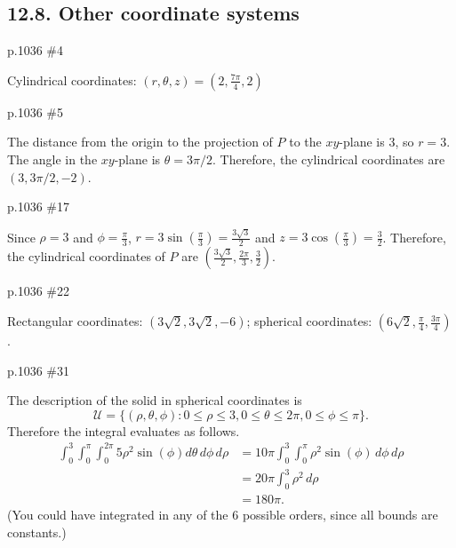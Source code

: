 \subsection{12.8. Other coordinate systems}
\begin{practice}p.1036 \#4\end{practice}
\begin{pracsol}
  Cylindrical coordinates: $(r,\theta,z)=\left(2,\frac{7\pi}4,2\right)$
\end{pracsol}
\begin{practice}p.1036 \#5\end{practice}
\begin{pracsol}
  The distance from the origin to the projection of $P$ to the $xy$-plane is 3, so $r=3$. The angle in the $xy$-plane is $\theta=3\pi/2$. Therefore, the cylindrical coordinates are $(3,3\pi/2,-2)$.
\end{pracsol}
\begin{practice}p.1036 \#17\end{practice}
\begin{pracsol}
  Since $\rho=3$ and $\phi=\frac\pi3$, $r=3\sin(\frac\pi3)=\frac{3\sqrt3}2$ and $z=3\cos(\frac\pi3)=\frac32$. Therefore, the cylindrical coordinates of $P$ are $\left(\frac{3\sqrt3}{2},\frac{2\pi}{3},\frac32\right)$.
\end{pracsol}
\begin{practice}p.1036 \#22\end{practice}
\begin{pracsol}
  Rectangular coordinates: $(3\sqrt2,3\sqrt2,-6)$; spherical coordinates: $(6\sqrt2,\frac\pi4,\frac{3\pi}4)$.
\end{pracsol}
\begin{practice}p.1036 \#31\end{practice}
\begin{pracsol}
  The description of the solid in spherical coordinates is
  \[\mathcal U=\{(\rho,\theta,\phi):0\leq\rho\leq3, 0\leq\theta\leq2\pi,0\leq\phi\leq\pi\}.\]
  Therefore the integral evaluates as follows.
  \[\begin{split}
    \int_0^3\int_0^\pi\int_0^{2\pi}5\rho^2\sin(\phi)d\theta\,d\phi\,d\rho &= 10\pi\int_0^3\int_0^\pi\rho^2\sin(\phi)\,d\phi\,d\rho\\
    &= 20\pi\int_0^3 \rho^2\,d\rho\\
    &= 180\pi.
  \end{split}\]
  (You could have integrated in any of the 6 possible orders, since all bounds are constants.)
\end{pracsol}

